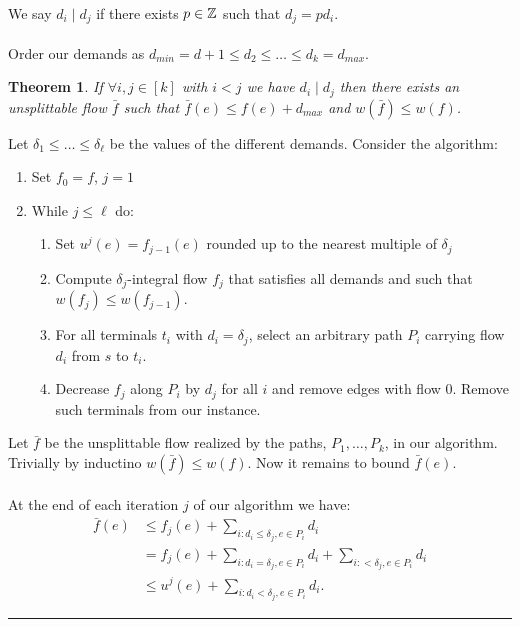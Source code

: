 \documentclass[letterpaper,12pt,oneside,onecolumn]{article}
\newenvironment{proof}{{\bf Proof:  }}{\hfill\rule{2mm}{2mm}}
\newtheorem{theorem}[fact]{Theorem}
\begin{document}
\paragraph{}
We say $d_i \mid d_j$ if there exists $p \in \mathbb{Z}$ such that $d_j = p d_i$.
\paragraph{}
Order our demands as $d_{min} = d+1 \leq d_2 \leq \dots \leq d_k = d_{max}$.
\begin{theorem}\label{th:div}
If $\forall i,j \in [k]$ with $i<j$ we have $d_i \mid d_j$ then there exists an unsplittable flow $\bar{f}$ such that $\bar{f}(e) \leq f(e) + d_{max}$ and $w(\bar{f}) \leq w(f)$.
\end{theorem}
\begin{proof}
Let $\delta_1\leq \dots \leq \delta_\ell$ be the values of the different demands. Consider the algorithm:

\begin{enumerate}
\item Set $f_0 = f$, $j=1$
\item While $j\leq \ell$ do:
	\begin{enumerate}
	\item Set $u^j(e) = f_{j-1}(e)$ rounded up to the nearest multiple of $\delta_j$
	\item Compute $\delta_j$-integral flow  $f_j$ that satisfies all demands and such that $w(f_j) \leq w(f_{j-1})$.
	\item For all terminals $t_i$ with $d_i = \delta_j$, select an arbitrary path $P_i$ carrying flow $d_i$ from $s$ to $t_i$.
	\item Decrease $f_j$ along $P_i$ by $d_j$ for all $i$ and remove edges with flow $0$. Remove such terminals from our instance.
	\end{enumerate}
\end{enumerate}
Let $\bar{f}$ be the unsplittable flow realized by the paths, $P_1, \dots, P_k$, in our algorithm. Trivially by inductino $w(\bar{f}) \leq w(f)$. Now it remains to bound $\bar{f}(e)$.
\paragraph{}
At the end of each iteration $j$ of our algorithm we have:
\begin{align*}
\bar{f}(e) &\leq f_j(e) + \sum_{i:d_i\leq \delta_j, e\in P_i} d_i \\
&= f_j(e) + \sum_{i:d_i = \delta_j, e\in P_i} d_i + \sum_{i:< \delta_j, e\in P_i} d_i \\
&\leq u^j(e) + \sum_{i:d_i < \delta_j, e\in P_i} d_i. 
\end{align*}

\end{proof}
\end{document}
